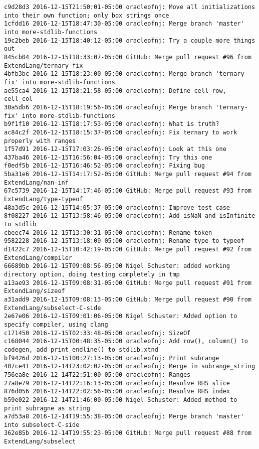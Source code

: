 \begin{lstlisting}
c9d28d3 2016-12-15T21:50:01-05:00 oracleofnj: Move all initializations into their own function; only box strings once
1cfdd16 2016-12-15T18:47:30-05:00 oracleofnj: Merge branch 'master' into more-stdlib-functions
19c2beb 2016-12-15T18:40:12-05:00 oracleofnj: Try a couple more things out
845cb04 2016-12-15T18:33:07-05:00 GitHub: Merge pull request #96 from ExtendLang/ternary-fix
4bfb3bc 2016-12-15T18:23:00-05:00 oracleofnj: Merge branch 'ternary-fix' into more-stdlib-functions
ae55ca4 2016-12-15T18:21:58-05:00 oracleofnj: Define cell_row, cell_col
30a5db6 2016-12-15T18:19:56-05:00 oracleofnj: Merge branch 'ternary-fix' into more-stdlib-functions
b9f1f10 2016-12-15T18:17:53-05:00 oracleofnj: What is truth?
ac84c2f 2016-12-15T18:15:37-05:00 oracleofnj: Fix ternary to work properly with ranges
1f57d91 2016-12-15T17:03:26-05:00 oracleofnj: Look at this one
437ba46 2016-12-15T16:56:04-05:00 oracleofnj: Try this one
f0edf5b 2016-12-15T16:46:52-05:00 oracleofnj: Fixing bug
5ba31e6 2016-12-15T14:17:52-05:00 GitHub: Merge pull request #94 from ExtendLang/nan-inf
67c5739 2016-12-15T14:17:46-05:00 GitHub: Merge pull request #93 from ExtendLang/type-typeof
48a3d5c 2016-12-15T14:05:37-05:00 oracleofnj: Improve test case
8f08227 2016-12-15T13:58:46-05:00 oracleofnj: Add isNaN and isInfinite to stdlib
cbeec74 2016-12-15T13:30:31-05:00 oracleofnj: Rename token
9582228 2016-12-15T13:18:09-05:00 oracleofnj: Rename type to typeof
d1422c7 2016-12-15T10:42:19-05:00 GitHub: Merge pull request #92 from ExtendLang/compiler
66689bb 2016-12-15T09:08:56-05:00 Nigel Schuster: added working directory option, doing testing completely in tmp
a13ae93 2016-12-15T09:08:31-05:00 GitHub: Merge pull request #91 from ExtendLang/sizeof
a31add9 2016-12-15T09:08:13-05:00 GitHub: Merge pull request #90 from ExtendLang/subselect-C-side
2e67e06 2016-12-15T09:01:06-05:00 Nigel Schuster: Added option to specify compiler, using clang
c171450 2016-12-15T02:33:48-05:00 oracleofnj: SizeOf
c168044 2016-12-15T00:48:35-05:00 oracleofnj: Add row(), column() to codegen, add print_endline() to stdlib.xtnd
bf9426d 2016-12-15T00:27:13-05:00 oracleofnj: Print subrange
407ce41 2016-12-14T23:02:02-05:00 oracleofnj: Merge in subrange_string
756ea8e 2016-12-14T22:51:00-05:00 oracleofnj: Ranges
27a8e79 2016-12-14T22:16:13-05:00 oracleofnj: Resolve RHS slice
876d056 2016-12-14T22:02:56-05:00 oracleofnj: Resolve RHS index
b59e022 2016-12-14T21:46:00-05:00 Nigel Schuster: Added method to print subragne as string
a7d53a8 2016-12-14T19:55:38-05:00 oracleofnj: Merge branch 'master' into subselect-C-side
362e85b 2016-12-14T19:55:23-05:00 GitHub: Merge pull request #88 from ExtendLang/subselect

\end{lstlisting}
